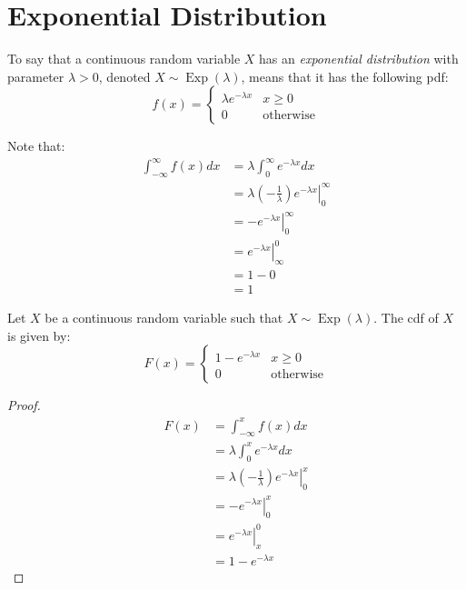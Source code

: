 \documentclass[letterpaper,12pt,fleqn]{article}
\DeclareMathOperator{\expd}{Exp}
\renewcommand{\l}{\lambda}
\begin{document}
\section*{Exponential Distribution}

\begin{definition}
  To say that a continuous random variable \(X\) has an \emph{exponential distribution} with parameter \(\l>0\), denoted
  \(X\sim\expd(\l)\), means that it has the following pdf:
  \[f(x)=\begin{cases}
  \l e^{-\l x} & x\ge0 \\
  0 & \text{otherwise}
  \end{cases}\]
\end{definition}

Note that:
\begin{align*}
  \int_{-\infty}^{\infty}f(x)dx &= \l\int_0^{\infty}e^{-\l x}dx \\
  &= \left.\l\left(-\frac{1}{\l}\right)e^{-\l x}\right|_0^{\infty} \\
  &= \left.-e^{-\l x}\right|_0^{\infty} \\
  &= \left.e^{-\l x}\right|_{\infty}^0 \\
  &= 1-0 \\
  &= 1
\end{align*}

\begin{theorem}
  Let \(X\) be a continuous random variable such that \(X\sim\expd(\l)\).  The cdf of \(X\) is given by:
  \[F(x)=\begin{cases}
  1-e^{-\l x} & x\ge0 \\
  0 & \text{otherwise}
  \end{cases}\]
\end{theorem}

\begin{proof}
  \begin{align*}
    F(x) &= \int_{-\infty}^xf(x)dx \\
    &= \l\int_0^xe^{-\l x}dx \\
    &= \left.\l\left(-\frac{1}{\l}\right)e^{-\l x}\right|_0^x \\
    &= \left.-e^{-\l x}\right|_0^x \\
    &= \left.e^{-\l x}\right|_x^0 \\
    &= 1-e^{-\l x}
  \end{align*}
\end{proof}
\end{document}
